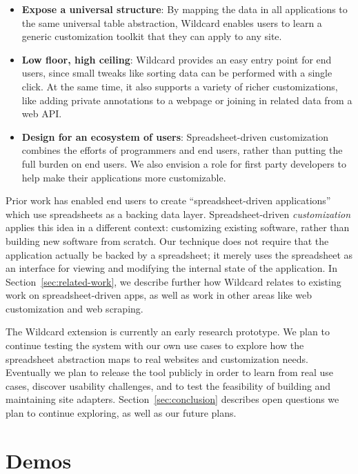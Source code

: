 \documentclass[english,submission]{programming}
\providecommand{\tightlist}{%
  \setlength{\itemsep}{0pt}\setlength{\parskip}{0pt}}
\begin{document}
\begin{itemize}
\tightlist
\item
  \textbf{Expose a universal structure}: By mapping the data in all
  applications to the same universal table abstraction, Wildcard enables
  users to learn a generic customization toolkit that they can apply to
  any site.
\item
  \textbf{Low floor, high ceiling}: Wildcard provides an easy entry
  point for end users, since small tweaks like sorting data can be
  performed with a single click. At the same time, it also supports a
  variety of richer customizations, like adding private annotations to a
  webpage or joining in related data from a web API.
\item
  \textbf{Design for an ecosystem of users}: Spreadsheet-driven
  customization combines the efforts of programmers and end users,
  rather than putting the full burden on end users. We also envision a
  role for first party developers to help make their applications more
  customizable.
\end{itemize}

Prior work \autocite{mccutchen2016,benson2014,chang2014} has enabled end
users to create ``spreadsheet-driven applications'' which use
spreadsheets as a backing data layer. Spreadsheet-driven
\emph{customization} applies this idea in a different context:
customizing existing software, rather than building new software from
scratch. Our technique does not require that the application actually be
backed by a spreadsheet; it merely uses the spreadsheet as an interface
for viewing and modifying the internal state of the application. In
Section~\ref{sec:related-work}, we describe further how Wildcard relates
to existing work on spreadsheet-driven apps, as well as work in other
areas like web customization and web scraping.

The Wildcard extension is currently an early research prototype. We plan
to continue testing the system with our own use cases to explore how the
spreadsheet abstraction maps to real websites and customization needs.
Eventually we plan to release the tool publicly in order to learn from
real use cases, discover usability challenges, and to test the
feasibility of building and maintaining site adapters.
Section~\ref{sec:conclusion} describes open questions we plan to
continue exploring, as well as our future plans.

\hypertarget{sec:demos}{%
\section{Demos}\label{sec:demos}}
\end{document}
